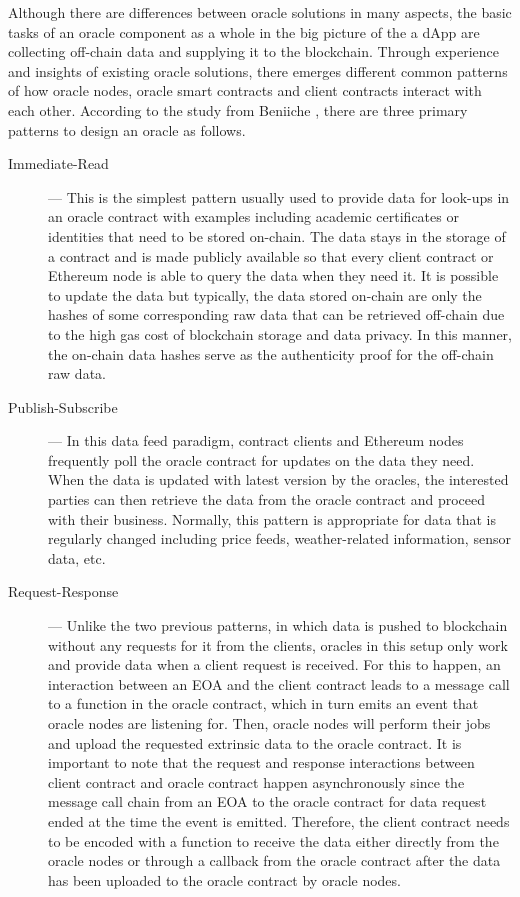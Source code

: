 Although there are differences between oracle solutions in many aspects, the basic tasks of an oracle component as a whole in the big picture of the a dApp are collecting off-chain data and supplying it to the blockchain. Through experience and insights of existing oracle solutions, there emerges different common patterns of how oracle nodes, oracle smart contracts and client contracts interact with each other. According to the study from Beniiche \cite{beniiche2020study}, there are three primary patterns to design an oracle as follows. 

\begin{description}
  \item[Immediate-Read] --- This is the simplest pattern usually used to provide data for look-ups in an oracle contract with examples including academic certificates or identities that need to be stored on-chain. The data stays in the storage of a contract and is made publicly available so that every client contract or Ethereum node is able to query the data when they need it. It is possible to update the data but typically, the data stored on-chain are only the hashes of some corresponding raw data that can be retrieved off-chain due to the high gas cost of blockchain storage and data privacy. In this manner, the on-chain data hashes serve as the authenticity proof for the off-chain raw data.
  
  \item[Publish-Subscribe] --- In this data feed paradigm, contract clients and Ethereum nodes frequently poll the oracle contract for updates on the data they need. When the data is updated with latest version by the oracles, the interested parties can then retrieve the data from the oracle contract and proceed with their business. Normally, this pattern is appropriate for data that is regularly changed including price feeds, weather-related information, sensor data, etc. 
  
  \item[Request-Response] --- Unlike the two previous patterns, in which data is pushed to blockchain without any requests for it from the clients, oracles in this setup only work and provide data when a client request is received. For this to happen, an interaction between an EOA and the client contract leads to a message call to a function in the oracle contract, which in turn emits an event that oracle nodes are listening for. Then, oracle nodes will perform their jobs and upload the requested extrinsic data to the oracle contract. It is important to note that the request and response interactions between client contract and oracle contract happen asynchronously since the message call chain from an EOA to the oracle contract for data request ended at the time the event is emitted. Therefore, the client contract needs to be encoded with a function to receive the data either directly from the oracle nodes or through a callback from the oracle contract after the data has been uploaded to the oracle contract by oracle nodes.
\end{description}

